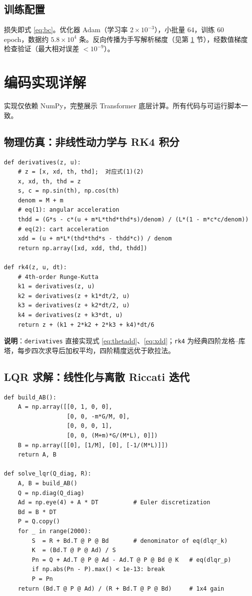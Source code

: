 \documentclass[11pt,a4paper]{article}
\begin{document}
\subsection{训练配置}

损失即式 \eqref{eq:bc}。优化器 Adam（学习率 $2\times 10^{-3}$），小批量 64，训练 60 epoch，数据约 $5.8\times 10^4$ 条。反向传播为手写解析梯度（见第 \ref{sec:impl} 节），经数值梯度检查验证（最大相对误差 $<10^{-9}$）。

\section{编码实现详解}
\label{sec:impl}

实现仅依赖 NumPy，完整展示 Transformer 底层计算。所有代码与可运行脚本一致。

\subsection{物理仿真：非线性动力学与 RK4 积分}

\begin{lstlisting}
def derivatives(z, u):
    # z = [x, xd, th, thd];  对应式(1)(2)
    x, xd, th, thd = z
    s, c = np.sin(th), np.cos(th)
    denom = M + m
    # eq(1): angular acceleration
    thdd = (G*s - c*(u + m*L*thd*thd*s)/denom) / (L*(1 - m*c*c/denom))
    # eq(2): cart acceleration
    xdd = (u + m*L*(thd*thd*s - thdd*c)) / denom
    return np.array([xd, xdd, thd, thdd])

def rk4(z, u, dt):
    # 4th-order Runge-Kutta
    k1 = derivatives(z, u)
    k2 = derivatives(z + k1*dt/2, u)
    k3 = derivatives(z + k2*dt/2, u)
    k4 = derivatives(z + k3*dt, u)
    return z + (k1 + 2*k2 + 2*k3 + k4)*dt/6
\end{lstlisting}

\textbf{说明}：\texttt{derivatives} 直接实现式 \eqref{eq:thetadd}、\eqref{eq:xdd}；\texttt{rk4} 为经典四阶龙格--库塔，每步四次求导后加权平均，四阶精度远优于欧拉法。

\subsection{LQR 求解：线性化与离散 Riccati 迭代}

\begin{lstlisting}
def build_AB():
    A = np.array([[0, 1, 0, 0],
                  [0, 0, -m*G/M, 0],
                  [0, 0, 0, 1],
                  [0, 0, (M+m)*G/(M*L), 0]])
    B = np.array([[0], [1/M], [0], [-1/(M*L)]])
    return A, B

def solve_lqr(Q_diag, R):
    A, B = build_AB()
    Q = np.diag(Q_diag)
    Ad = np.eye(4) + A * DT          # Euler discretization
    Bd = B * DT
    P = Q.copy()
    for _ in range(2000):
        S  = R + Bd.T @ P @ Bd       # denominator of eq(dlqr_k)
        K  = (Bd.T @ P @ Ad) / S
        Pn = Q + Ad.T @ P @ Ad - Ad.T @ P @ Bd @ K   # eq(dlqr_p)
        if np.abs(Pn - P).max() < 1e-13: break
        P = Pn
    return (Bd.T @ P @ Ad) / (R + Bd.T @ P @ Bd)     # 1x4 gain
\end{lstlisting}
\end{document}
